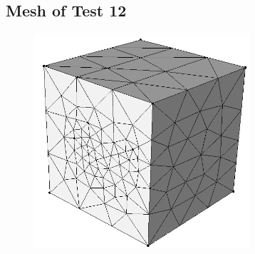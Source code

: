 \documentclass[a4paper, 12pt]{article}
\begin{document}
\subsection{Mesh of Test 12} \label{subsec:test12Img}
\begin{figure}[H]
  \centering
  \includegraphics[width=8cm, height=8cm]{test12_sms}
\end{figure}
\end{document}

